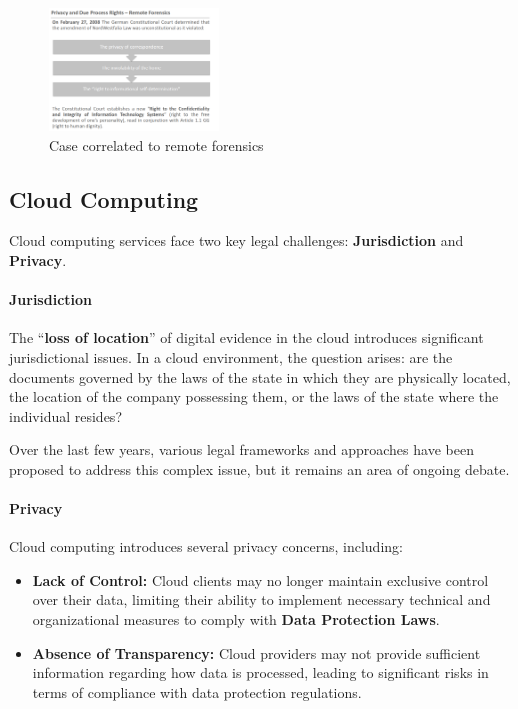 \begin{figure}[h!]
  \centering
  \includegraphics[width=0.4\textwidth]{img/remote_case.png}
  \caption{Case correlated to remote forensics}
  \label{fig:remote process}
\end{figure}

\subsection{Cloud Computing}

Cloud computing services face two key legal challenges: \textbf{Jurisdiction} and \textbf{Privacy}.

\paragraph{Jurisdiction}
The “\textbf{loss of location}” of digital evidence in the cloud introduces significant jurisdictional issues. In a cloud environment, the question arises: are the documents governed by the laws of the state in which they are physically located, the location of the company possessing them, or the laws of the state where the individual resides?

Over the last few years, various legal frameworks and approaches have been proposed to address this complex issue, but it remains an area of ongoing debate.

\paragraph{Privacy}
Cloud computing introduces several privacy concerns, including:
\begin{itemize}
  \item \textbf{Lack of Control:} Cloud clients may no longer maintain exclusive control over their data, limiting their ability to implement necessary technical and organizational measures to comply with \textbf{Data Protection Laws}.
  \item \textbf{Absence of Transparency:} Cloud providers may not provide sufficient information regarding how data is processed, leading to significant risks in terms of compliance with data protection regulations.
\end{itemize}

